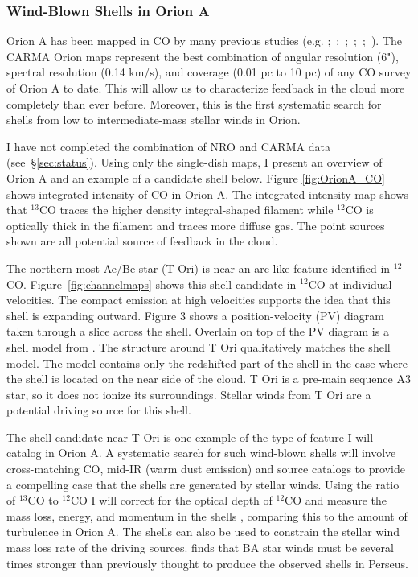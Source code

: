        \subsubsection{Wind-Blown Shells in Orion A}\label{sec:paper1}
Orion A has been mapped in CO by many previous studies (e.g. \citet{Bally87};~\citet{Wilson05};~\citet{Shimajiri11};~\citet{Buckle12};~\citet{Berne14};~\citet{Nishimura15}). The CARMA Orion maps represent the best combination of angular resolution (6"), spectral resolution (0.14 km/s), and coverage (0.01 pc to 10 pc) of any CO survey of Orion A to date. This will allow us to characterize feedback in the cloud more completely than ever before. Moreover, this is the first systematic search for shells from low to intermediate-mass stellar winds in Orion.
        
I have not completed the combination of NRO and CARMA data (see~\S\ref{sec:status}). Using only the single-dish maps, I present an overview of Orion A and an example of a candidate shell below. Figure \ref{fig:OrionA_CO} shows integrated intensity of CO in Orion A. The integrated intensity map shows that $^{13}$CO traces the higher density integral-shaped filament while $^{12}$CO is optically thick in the filament and traces more diffuse gas. The point sources shown are all potential source of feedback in the cloud.

The northern-most Ae/Be star (T Ori) is near an arc-like feature identified in $^{12}$CO. Figure~\ref{fig:channelmaps} shows this shell candidate in $^{12}$CO at individual velocities. The compact emission at high velocities supports the idea that this shell is expanding outward. Figure 3 shows a position-velocity (PV) diagram taken through a slice across the shell. Overlain on top of the PV diagram is a shell model from \citet{Arce_2011}. The structure around T Ori qualitatively matches the shell model. The model contains only the redshifted part of the shell in the case where the shell is located on the near side of the cloud.  T Ori is a pre-main sequence A3 star, so it does not ionize its surroundings. Stellar winds from T Ori are a potential driving source for this shell.

The shell candidate near T Ori is one example of the type of feature I will catalog in Orion A. A systematic search for such wind-blown shells will involve cross-matching CO, mid-IR (warm dust emission) and source catalogs to provide a compelling case that the shells are generated by stellar winds. Using the ratio of $^{13}$CO to $^{12}$CO I will correct for the optical depth of $^{12}$CO and measure the mass loss, energy, and momentum in the shells \cite{Arce_2011}, comparing this to the amount of turbulence in Orion A. The shells can also be used to constrain the stellar wind mass loss rate of the driving sources. \citet{Offner15} finds that BA star winds must be several times stronger than previously thought to produce the observed shells in Perseus.
